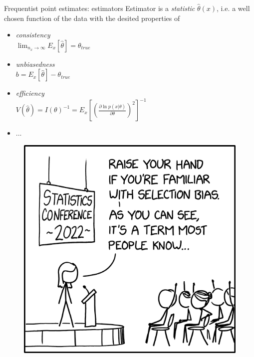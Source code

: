 \documentclass[
aspectratio=169,
14pt,
professionalfonts
]{beamer}
\begin{document}
\begin{frame}{Frequentist point estimates: estimators}
    Estimator is a \textit{statistic} $\hat \theta(x)$, i.e. a well chosen function of the data with the desited properties of
    \begin{minipage}{0.65\textwidth}
        \begin{itemize}
            \item \textit{consistency}\\
            $\lim_{n_x \to \infty} E_x[\hat \theta] = \theta_{true}$
            \item \textit{unbiasedness}\\
            $b = E_x[\hat \theta] - \theta_{true}$
            
            \item \textit{efficiency}\\
            $V(\hat \theta) = I(\theta)^{-1} = E_x\left[\left(\frac{\partial \ln p(x|\theta)}{\partial \theta}\right)^2\right]^{-1}$
            \item ...
        \end{itemize}
    \end{minipage}
    \begin{minipage}{0.34\textwidth}
        \begin{figure}
            \centering
            \includegraphics[width=\linewidth]{../plots/selection_bias_2x.png}
        \end{figure}
    \end{minipage}
\end{frame}
\end{document}
